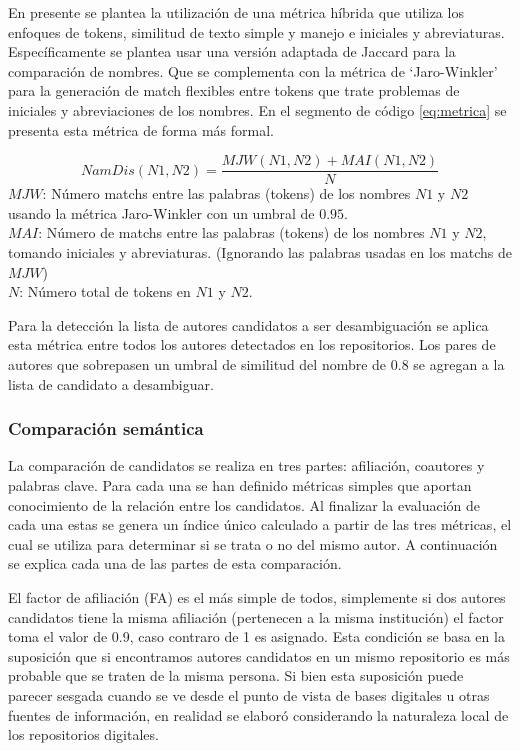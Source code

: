 \documentclass[conference]{IEEEtran}
\begin{document}
En presente se plantea la utilización de una métrica híbrida que utiliza los enfoques de tokens, similitud de texto simple y manejo e iniciales y abreviaturas. Específicamente se plantea usar una versión adaptada de Jaccard para la comparación de nombres. Que se complementa con la  métrica de ‘Jaro-Winkler’ para la generación de  match flexibles entre tokens que trate problemas de iniciales y abreviaciones de los nombres. En el segmento de código \ref{eq:metrica} se presenta esta métrica de forma más formal.

\begin{equation}\label{eq:metrica}
NamDis(N1, N2) = \frac{MJW(N1, N2)+ MAI(N1,N2)}{N}
\end{equation}
$MJW$: Número matchs entre las palabras (tokens) de los nombres $N1$ y $N2$ usando la métrica Jaro-Winkler con un umbral de $0.95$.\\
$MAI$: Número de matchs entre las palabras (tokens) de los nombres $N1$ y $N2$, tomando iniciales y abreviaturas. (Ignorando las palabras usadas en los matchs de $MJW$)\\
$N$: Número total de tokens en $N1$ y $N2$.

Para la detección la lista de autores candidatos a ser desambiguación se aplica esta métrica entre todos los autores detectados en los repositorios. Los pares de autores que sobrepasen un umbral de similitud del nombre de $0.8$  se agregan a la lista de candidato a desambiguar.

\subsubsection{Comparación semántica}
La comparación de candidatos se realiza en tres partes:  afiliación, coautores y palabras clave. Para cada una se han definido métricas simples  que aportan conocimiento de la relación entre los candidatos. Al finalizar la evaluación de cada una estas se genera un índice único calculado a partir de las tres métricas, el cual se utiliza para determinar si se trata o no del mismo autor.   A continuación se explica cada una de las partes de esta comparación.

El factor de afiliación (FA) es el más simple de todos, simplemente si dos autores candidatos tiene la misma afiliación (pertenecen a la misma institución) el factor toma el valor de 0.9, caso contraro de 1 es asignado. Esta condición se basa en la suposición que si encontramos autores candidatos en un mismo repositorio es más probable que se traten de la misma persona. Si bien esta suposición puede parecer sesgada cuando se ve desde el punto de vista de bases digitales u otras fuentes de información, en realidad se elaboró considerando la naturaleza local de los repositorios digitales.
 
\end{document}
